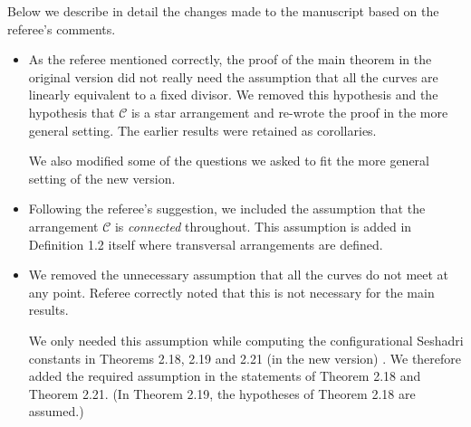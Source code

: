 \documentclass[12pt,twoside,reqno]{amsart}
\numberwithin{equation}{section}
\theoremstyle{definition}
\begin{document}
Below we describe in detail the changes made to the manuscript based on the referee's comments. 
\begin{itemize}

\item As the referee mentioned correctly, the proof of the main theorem in the original version did not really need the assumption that all the curves are linearly equivalent to a fixed divisor. We removed this hypothesis and the hypothesis that $\mathcal{C}$ is a star arrangement and re-wrote the proof in the more general setting. The earlier results were retained as corollaries. 

We also modified some of the questions we asked to fit the more general setting of the new version. 



\item Following the referee's suggestion, we included the assumption that the arrangement $\mathcal{C}$ is \textit{connected} throughout. 
This assumption is added in Definition 1.2 itself where transversal arrangements are defined. 


\item We  removed the unnecessary assumption that all the curves do not meet at any point. Referee correctly noted that this is not necessary for the main results. 

We only needed this assumption while computing the configurational Seshadri constants in  Theorems 2.18, 2.19 and 2.21 (in the new version) . We therefore added the required assumption in the statements of Theorem 2.18 and Theorem 2.21. (In Theorem 2.19, the hypotheses of Theorem 2.18 are assumed.)



\end{itemize}
\end{document}
